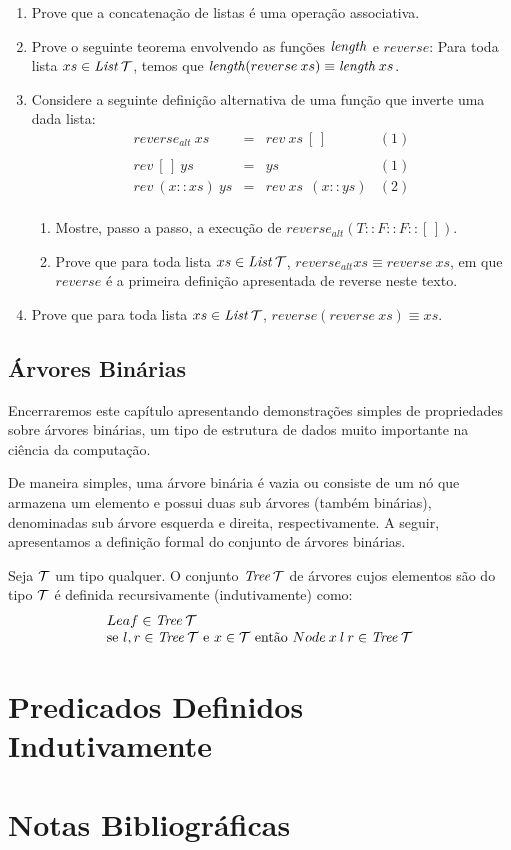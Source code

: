 \begin{enumerate}
  \item Prove que a concatenação de listas é uma operação associativa.
  \item Prove o seguinte teorema envolvendo as funções $\textit{length\/}$ e
    $reverse$: Para toda lista $xs \in \textit{List\/}\,\mathcal{T}$, temos que
    $\textit{length\/}(reverse \:xs)\equiv \textit{length\/}\:xs$.
 \item Considere a seguinte definição alternativa de uma função que
   inverte uma dada lista:
\[
\begin{array}{lclc}
  reverse_{alt}\:xs & = & rev\: xs \: [\,] & (1)\\
   & \\
  rev \: [\,] \: ys & = & ys & (1) \\
  rev \: (x :: xs) \: ys & = & rev \: xs \:\:(x :: ys) & (2)\\
\end{array}
\]
 \begin{enumerate}
   \item Mostre, passo a passo, a execução de $reverse_{alt}(T :: F ::
     F :: [\,])$.
   \item Prove que para toda lista $xs \in \textit{List\/}\,\mathcal{T}$,
     $reverse_{alt}xs \equiv reverse\: xs$, em que $reverse$ é a
     primeira definição apresentada de reverse neste texto.
  \end{enumerate}
  \item Prove que para toda lista $xs\in\textit{List\/}\,\mathcal{T}$,
    $reverse(reverse\:xs) \equiv xs$.
\end{enumerate}

\subsection{Árvores Binárias}

Encerraremos este capítulo apresentando demonstrações simples de
propriedades sobre árvores binárias, um tipo de estrutura de dados
muito importante na ciência da computação.

De maneira simples, uma árvore binária é vazia ou consiste de um nó
que armazena um elemento e possui duas sub árvores (também binárias),
denominadas sub árvore esquerda e direita, respectivamente. A seguir,
apresentamos a definição formal do conjunto de árvores binárias.

\begin{Definition}
Seja $\mathcal{T}$ um tipo qualquer. O conjunto $\textit{Tree\/}\,\mathcal{T}$ de árvores
cujos elementos são do tipo $\mathcal{T}$ é definida recursivamente
(indutivamente) como:
\[
\begin{array}{l}
   Leaf \in \textit{Tree\/}\:\mathcal{T} \\
   \text{se }l,r \in \textit{Tree\/}\:\mathcal{T} \text{ e } x\in\mathcal{T} \text{ então } Node\:x\:l\:r\in\textit{Tree\/}\:\mathcal{T}
\end{array}
\]
\end{Definition}

\section{Predicados Definidos Indutivamente}

\section{Notas Bibliográficas}
